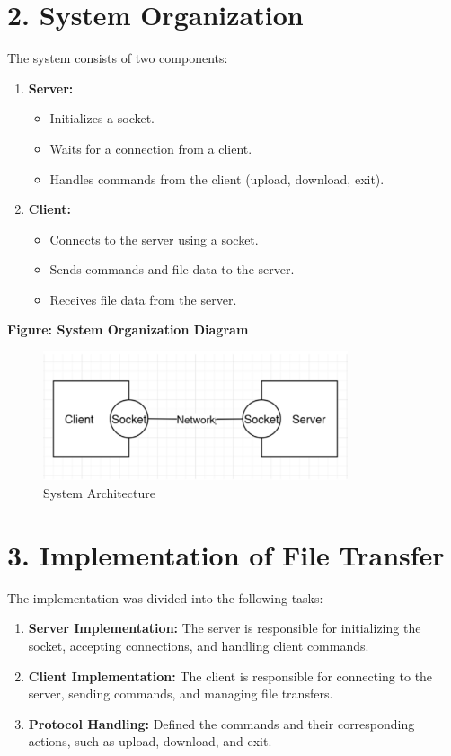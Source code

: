 \documentclass[a4paper,12pt]{article}
\begin{document}
\section*{2. System Organization}
The system consists of two components:
\begin{enumerate}
    \item \textbf{Server:}
    \begin{itemize}
        \item Initializes a socket.
        \item Waits for a connection from a client.
        \item Handles commands from the client (upload, download, exit).
    \end{itemize}
    \item \textbf{Client:}
    \begin{itemize}
        \item Connects to the server using a socket.
        \item Sends commands and file data to the server.
        \item Receives file data from the server.
    \end{itemize}
\end{enumerate}

\noindent \textbf{Figure: System Organization Diagram}
\begin{figure}[h!]
    \centering
    \includegraphics[width=0.8\textwidth]{system.png} %
    \caption{System Architecture}
\end{figure}

\section*{3. Implementation of File Transfer}
The implementation was divided into the following tasks:
\begin{enumerate}
    \item \textbf{Server Implementation:} The server is responsible for initializing the socket, accepting connections, and handling client commands.
    \item \textbf{Client Implementation:} The client is responsible for connecting to the server, sending commands, and managing file transfers.
    \item \textbf{Protocol Handling:} Defined the commands and their corresponding actions, such as upload, download, and exit.
\end{enumerate}
\end{document}
